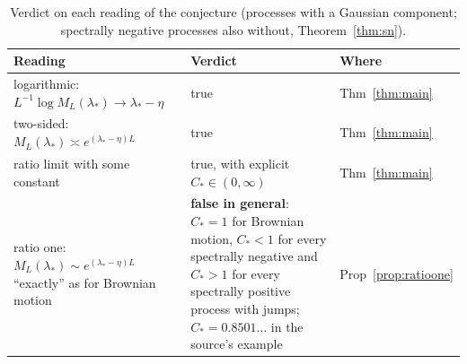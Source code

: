 \documentclass[11pt,a4paper]{article}
\theoremstyle{definition}
\theoremstyle{remark}
\newcommand{\1}{\mathbf 1}
\begin{document}
\begin{table}[h]
\centering\small
\caption{Verdict on each reading of the conjecture (processes with a Gaussian component; spectrally negative processes also without, Theorem~\ref{thm:sn}).}\label{tab:verdict}
\begin{tabularx}{\textwidth}{@{}p{}Xl@{}}
\toprule
Reading & Verdict & Where\\
\midrule
logarithmic: $L^{-1}\log M_L(\lambda_*)\to\lambda_*-\eta$ & true & Thm~\ref{thm:main}\\
two-sided: $M_L(\lambda_*)\asymp e^{(\lambda_*-\eta)L}$ & true & Thm~\ref{thm:main}\\
ratio limit with some constant & true, with explicit $C_*\in(0,\infty)$ & Thm~\ref{thm:main}\\
ratio one: $M_L(\lambda_*)\sim e^{(\lambda_*-\eta)L}$ ``exactly'' as for Brownian motion & \textbf{false in general}: $C_*=1$ for Brownian motion, $C_*<1$ for every spectrally negative and $C_*>1$ for every spectrally positive process with jumps; $C_*=0.8501\ldots$ in the source's example & Prop~\ref{prop:ratioone}\\
\bottomrule
\end{tabularx}
\end{table}
\end{document}
